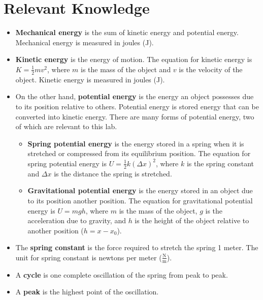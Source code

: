 \documentclass[titlepage]{article}
\begin{document}
    \section{Relevant Knowledge}\label{sec:relevant-knowledge}
        \begin{itemize}
            \item \textbf{Mechanical energy} is the sum of kinetic energy and potential energy.
            Mechanical energy is measured in joules (J).
            \item \textbf{Kinetic energy} is the energy of motion.
            The equation for kinetic energy is $K = \frac{1}{2}mv^2$, where $m$ is the mass of the object and $v$ is the velocity of the object.
            Kinetic energy is measured in joules (J).
            \item On the other hand, \textbf{potential energy} is the energy an object possesses due to its position relative to others.
            Potential energy is stored energy that can be converted into kinetic energy.
            There are many forms of potential energy, two of which are relevant to this lab.
            \begin{itemize}
                \item \textbf{Spring potential energy} is the energy stored in a spring when it is stretched or compressed from its equilibrium position.
                The equation for spring potential energy is $U = \frac{1}{2}k(\Delta x)^2$, where $k$ is the spring constant and $\Delta x$ is the distance the spring is stretched.
                \item \textbf{Gravitational potential energy} is the energy stored in an object due to its position another position.
                The equation for gravitational potential energy is $U = mgh$, where $m$ is the mass of the object, $g$ is the acceleration due to gravity, and $h$ is the height of the object relative to another position ($h = x-x_0$).
            \end{itemize}
            \item The \textbf{spring constant} is the force required to stretch the spring 1 meter.
            The unit for spring constant is newtons per meter ($\frac{\text{N}}{\text{m}}$).
            \item A \textbf{cycle} is one complete oscillation of the spring from peak to peak.
            \item A \textbf{peak} is the highest point of the oscillation.
        \end{itemize}
    
\end{document}
